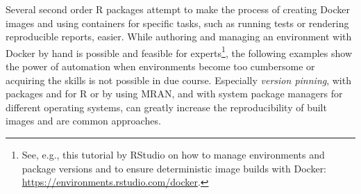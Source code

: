 Several second order R packages attempt to make the process of creating
Docker images and using containers for specific tasks, such as running
tests or rendering reproducible reports, easier. While authoring and
managing an environment with Docker by hand is possible and feasible for
experts\footnote{See, e.g., this tutorial by RStudio on how to manage environments and package versions and to ensure deterministic image builds with Docker: \href{https://environments.rstudio.com/docker}{https://environments.rstudio.com/docker}.},
the following examples show the power of automation when environments
become too cumbersome or acquiring the skills is not possible in due
course. Especially \emph{version pinning}, with packages 
and  for R or by using MRAN, and with system package
managers for different operating systems, can greatly increase the
reproducibility of built images and are common approaches.

